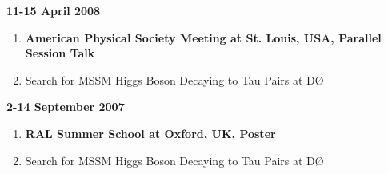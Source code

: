 \documentclass[12pt]{article}
\newenvironment{outerlist}[1][\enskip\textbullet]%
        {\begin{enumerate}[#1]}{\end{enumerate}%
         \vspace{-.6\baselineskip}}
\begin{document}
\vspace{2mm}
\textbf{11-15 April 2008}
\begin{outerlist}
\item[] \textbf{American Physical Society Meeting at St. Louis, USA, Parallel Session Talk}\vspace{-2mm}
\item[] Search for MSSM Higgs Boson Decaying to Tau Pairs at D\O
\end{outerlist}
\vspace{2mm}
\textbf{2-14 September 2007}
\begin{outerlist}
\item[] \textbf{RAL Summer School at Oxford, UK, Poster}\vspace{-2mm}
\item[] Search for MSSM Higgs Boson Decaying to Tau Pairs at D\O
\end{outerlist}
\vspace{2mm}
\end{document}
